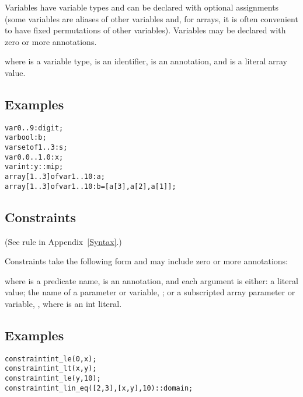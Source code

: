 \documentclass[a4paper]{article}
\begin{document}
Variables have variable types and can be declared with optional assignments
(some variables are aliases of other variables and, for arrays,
it is often convenient to have fixed permutations of other
variables).  Variables may be declared with zero or more annotations.

\fz{
\fzvartype: \fzvarname{} $[:: \fzannotation]^*$
	\textbf{[} \tt{=} \fzarrayliteral\textbf{]};
}

where \fzvartype{} is a variable type, \fzvarname{} is an identifier,
\fzannotation{} is an annotation, and \fzarrayliteral{} is a literal array
value.

\subsection*{Examples}

\begin{alltt}
var 0..9: digit;
var bool: b;
var set of 1..3: s;
var 0.0..1.0: x;
var int: y :: mip;        % 'mip' annotation: y should be a MIP variable.
array [1..3] of var 1..10: a;
array [1..3] of var 1..10: b = [a[3], a[2], a[1]];
\end{alltt}

\subsection{Constraints}

(See rule  in Appendix~\ref{Syntax}.)

Constraints take the following form and may include zero or more annotations:


where \fzpredname{} is a predicate name, \fzannotation{} is an
annotation,
and each argument \fzarg{} is either: 
a literal value;
the name of a parameter or variable, \fzv;
or a subscripted array parameter or variable, \fzvj, where \fzj{} is an
int literal.

\subsection*{Examples}

\begin{alltt}
constraint int_le(0, x);    % 0 <= x
constraint int_lt(x, y);    % x <  y
constraint int_le(y, 10);   % y <= 10
    % 'domain': use domain consistency for this constraint:
    % 2x + 3y = 10
constraint int_lin_eq([2, 3], [x, y], 10) :: domain;
\end{alltt}
\end{document}
